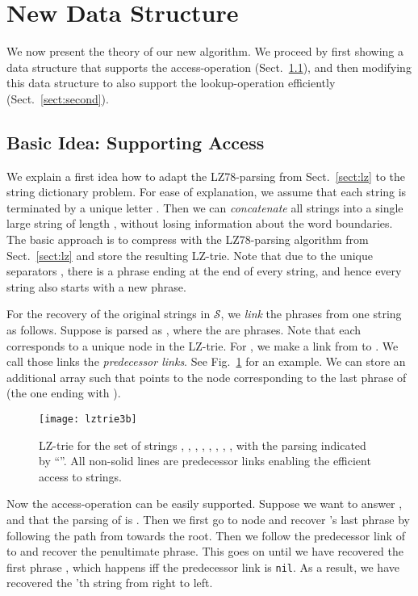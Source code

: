 \documentclass{llncs}
\newcommand{\strings}{\ensuremath{\mathcal{S}}}
\begin{document}
\section{New Data Structure}
\label{sect:theoretical}

We now present the theory of our new algorithm. We proceed by first showing a data structure that supports the access-operation (Sect.\ \ref{sect:first}), and then modifying this data structure to also support the lookup-operation efficiently (Sect.\ \ref{sect:second}).

\subsection{Basic Idea: Supporting Access}
\label{sect:first}

We explain a first idea how to adapt the LZ78-parsing from Sect.~\ref{sect:lz} to the string dictionary problem. For ease of explanation, we assume that each string  is terminated by a unique letter . Then we can \emph{concatenate} all strings into a single large string  of length , without losing information about the word boundaries. The basic approach is to compress  with the LZ78-parsing algorithm from Sect.~\ref{sect:lz} and store the resulting LZ-trie. Note that due to the unique separators , there is a phrase ending at the end of every string, and hence every string also starts with a new phrase.

For the recovery of the original strings in \strings, we \emph{link} the phrases from one string as follows. Suppose  is parsed as , where the  are phrases. Note that each  corresponds to a unique node  in the LZ-trie. For , we make a link from  to . We call those links the \emph{predecessor links}. See Fig.\ \ref{fig:example1} for an example. We can store an additional array  such that  points to the node corresponding to the last phrase  of  (the one ending with ).

\begin{figure}[t]
  \centering
  \texttt{[image: lztrie3b]}
  \caption{LZ-trie for the set of strings , , , , , , , , with the parsing indicated by ``''. All non-solid lines are predecessor links enabling the efficient access to strings.}
  \label{fig:example1}
\end{figure}

Now the access-operation can be easily supported. Suppose we want to answer , and that the parsing of  is . Then we first go to node  and recover 's last phrase  by following the path from  towards the root.
Then we follow the predecessor link of  to  and recover the penultimate phrase. This goes on until we have recovered the first phrase , which happens iff the predecessor link is \texttt{nil}. As a result, we have recovered the 'th string from right to left.
\end{document}
